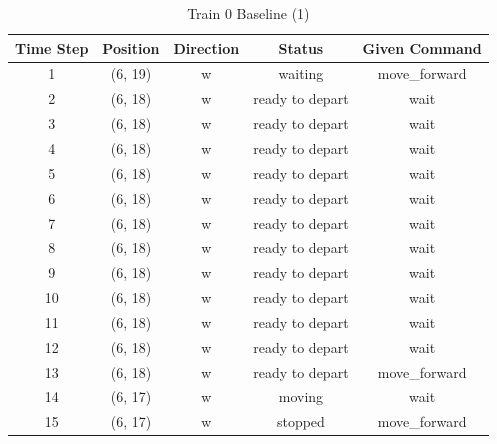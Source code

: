 \begin{table}
\centering
\scriptsize
\caption{Train 0 Baseline (1)}
\label{tab:base0}
\begin{tabular}{c c c c c}
\hline
\textbf{Time Step} & \textbf{Position} & \textbf{Direction} & \textbf{Status} & \textbf{Given Command} \\
\hline
1 & (6, 19) & w & waiting & move\_forward \\
2 & (6, 18) & w & ready to depart & wait \\
3 & (6, 18) & w & ready to depart & wait \\
4 & (6, 18) & w & ready to depart & wait \\
5 & (6, 18) & w & ready to depart & wait \\
6 & (6, 18) & w & ready to depart & wait \\
7 & (6, 18) & w & ready to depart & wait \\
8 & (6, 18) & w & ready to depart & wait \\
9 & (6, 18) & w & ready to depart & wait \\
10 & (6, 18) & w & ready to depart & wait \\
11 & (6, 18) & w & ready to depart & wait \\
12 & (6, 18) & w & ready to depart & wait \\
13 & (6, 18) & w & ready to depart & move\_forward \\
14 & (6, 17) & w & moving & wait \\
15 & (6, 17) & w & stopped & move\_forward \\
\hline
\end{tabular}
\end{table}